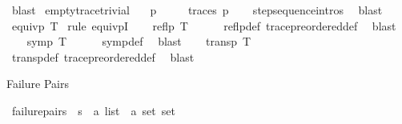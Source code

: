 \begin{isabellebody}
\ blast%
\endisatagproof
{\isafoldproof}%
%
\isadelimproof
\isanewline
%
\endisadelimproof
\isanewline
{}\isamarkupfalse%
\ empty{\isacharunderscore}{\kern0pt}trace{\isacharunderscore}{\kern0pt}trivial{\isacharcolon}{\kern0pt}\isanewline
\ \ \ p\isanewline
\ \ \ {\isacartoucheopen}{\isacharbrackleft}{\kern0pt}{\isacharbrackright}{\kern0pt}\ {\isasymin}\ traces\ p{\isacartoucheclose}\isanewline
%
\isadelimproof
\ \ %
\endisadelimproof
%
\isatagproof
{}\isamarkupfalse%
\ step{\isacharunderscore}{\kern0pt}sequence{\isachardot}{\kern0pt}intros\ \isamarkupfalse%
\ blast%
\endisatagproof
{\isafoldproof}%
%
\isadelimproof
\isanewline
%
\endisadelimproof
\isanewline
{}\isamarkupfalse%
\ {\isacartoucheopen}equivp\ {\isacharparenleft}{\kern0pt}{\isasymsimeq}T{\isacharparenright}{\kern0pt}{\isacartoucheclose}\isanewline
%
\isadelimproof
%
\endisadelimproof
%
\isatagproof
{}\isamarkupfalse%
\ {\isacharparenleft}{\kern0pt}rule\ equivpI{\isacharparenright}{\kern0pt}\isanewline
\ \ \isamarkupfalse%
\ {\isacartoucheopen}reflp\ {\isacharparenleft}{\kern0pt}{\isasymsimeq}T{\isacharparenright}{\kern0pt}{\isacartoucheclose}\isanewline
\ \ \ \ \isamarkupfalse%
\ reflp{\isacharunderscore}{\kern0pt}def\ trace{\isacharunderscore}{\kern0pt}preordered{\isacharunderscore}{\kern0pt}def\ \isamarkupfalse%
\ blast\isanewline
\ \ \isamarkupfalse%
\ {\isacartoucheopen}symp\ {\isacharparenleft}{\kern0pt}{\isasymsimeq}T{\isacharparenright}{\kern0pt}{\isacartoucheclose}\isanewline
\ \ \ \ \isamarkupfalse%
\ symp{\isacharunderscore}{\kern0pt}def\ \isamarkupfalse%
\ blast\isanewline
\ \ \isamarkupfalse%
\ {\isacartoucheopen}transp\ {\isacharparenleft}{\kern0pt}{\isasymsimeq}T{\isacharparenright}{\kern0pt}{\isacartoucheclose}\isanewline
\ \ \ \ \isamarkupfalse%
\ transp{\isacharunderscore}{\kern0pt}def\ trace{\isacharunderscore}{\kern0pt}preordered{\isacharunderscore}{\kern0pt}def\ \isamarkupfalse%
\ blast\isanewline
{}\isamarkupfalse%
%
\endisatagproof
{\isafoldproof}%
%
\isadelimproof
%
\endisadelimproof
%
\begin{isamarkuptext}%
Failure Pairs%
\end{isamarkuptext}\isamarkuptrue%
\isamarkupfalse%
\ failure{\isacharunderscore}{\kern0pt}pairs\ {\isacharcolon}{\kern0pt}{\isacharcolon}{\kern0pt}\ {\isacartoucheopen}{\isacharprime}{\kern0pt}s\ {\isasymRightarrow}\ {\isacharparenleft}{\kern0pt}{\isacharprime}{\kern0pt}a\ list\ {\isasymtimes}\ {\isacharprime}{\kern0pt}a\ set{\isacharparenright}{\kern0pt}\ set{\isacartoucheclose}\isanewline

\end{isabellebody}

